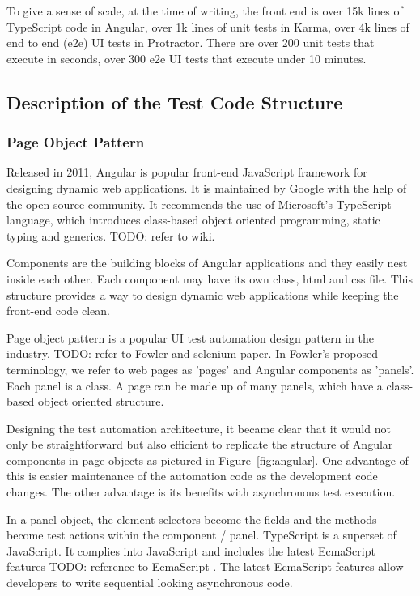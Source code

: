 \documentclass[conference]{IEEEtran}
\newcommand{\todo}[1]{}
\renewcommand{\todo}[1]{{\color{red} TODO: {#1}}}
\begin{document}
	To give a sense of scale, at the time of writing, the front end is over 15k lines of TypeScript code in Angular, over 1k lines of unit tests in Karma, over 4k lines of end to end (e2e) UI tests in Protractor. 
	There are over 200 unit tests that execute in seconds, over 300 e2e UI tests that execute under 10 minutes. 



\subsection{Description of the Test Code Structure}

	\subsubsection{Page Object Pattern}

	Released in 2011, Angular is popular front-end JavaScript framework for designing dynamic web applications.
	It is maintained by Google with the help of the open source community.
	It recommends the use of Microsoft's TypeScript language, which introduces class-based object oriented programming, static typing and generics. \todo{refer to wiki}.

	Components are the building blocks of Angular applications and they easily nest inside each other.
	Each component may have its own class, html and css file. This structure provides a way to design dynamic web applications while keeping the front-end code clean. 

	Page object pattern is a popular UI test automation design pattern in the industry. \todo{refer to Fowler and selenium paper}.
	In Fowler's proposed terminology, we refer to web pages as 'pages' and Angular components as 'panels'.
	Each panel is a class. A page can be made up of many panels, which have a class-based object oriented structure.   

	Designing the test automation architecture, it became clear that it would not only be straightforward but also efficient to replicate the structure of Angular components in page objects as pictured in Figure~\ref{fig:angular}.
	One advantage of this is easier maintenance of the automation code as the development code changes.
	The other advantage is its benefits with asynchronous test execution.

	In a panel object, the element selectors become the fields and the methods become test actions within the component / panel. 
	TypeScript is a superset of JavaScript. It complies into JavaScript and includes the latest EcmaScript features \todo{reference to EcmaScript} .
	The latest EcmaScript features allow developers to write sequential looking asynchronous code.
\end{document}
